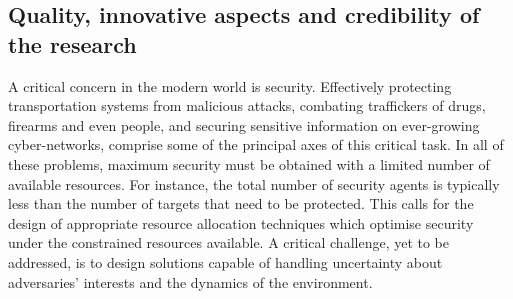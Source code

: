 
\subsection{Quality, innovative aspects and credibility of the research} %
\label{sec:quality}

A critical concern in the modern world is security. Effectively protecting %
transportation systems from malicious attacks, combating traffickers of drugs, firearms and even people, and securing %
sensitive information on ever-growing cyber-networks, comprise some of the principal axes of this critical task.
 In all of these problems,  maximum security must be obtained with a limited number of available resources. 
For instance, the total number of security agents is typically less than the number of targets that need to be protected. %
This calls for the design of appropriate resource allocation techniques which optimise security under the constrained resources available. A critical challenge, yet to be addressed, is to design solutions capable of handling uncertainty about adversaries' interests and the dynamics of the environment.


